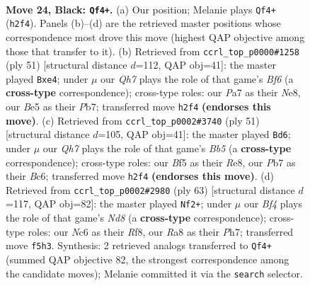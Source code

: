 \documentclass[11pt]{article}
\begin{document}
\clearpage

\begin{figure}[p]\centering
\begin{subfigure}{0.46\textwidth}\centering
\resizebox{\linewidth}{!}{%
\newchessgame
\chessboard[
  setfen={r3k3/pp6/2n3p1/4bbP1/8/3BQ3/3B3q/1R3KN1 b q - 2 24},
  showmover=false,
  pgfstyle=straightmove, color=movearrow, markmove={h2-f4}
]}
\caption{}
\end{subfigure}\hfill
\begin{subfigure}{0.46\textwidth}\centering
\resizebox{\linewidth}{!}{%
\newchessgame
\chessboard[
  setfen={4n1k1/ppr3b1/3p3B/3Pp2p/4N3/3B1b1q/PP1Q4/1K4R1 b - - 9 26},
  showmover=false,
  pgfstyle=straightmove, color=movearrow, markmove={f3-e4}
]}
\caption{}
\end{subfigure}
\\[4pt]
\begin{subfigure}{0.46\textwidth}\centering
\resizebox{\linewidth}{!}{%
\newchessgame
\chessboard[
  setfen={4r1k1/3q4/p1b4p/3pB3/1b4P1/2NPQ2P/1P6/5RK1 b - - 0 26},
  showmover=false,
  pgfstyle=straightmove, color=movearrow, markmove={b4-d6}
]}
\caption{}
\end{subfigure}\hfill
\begin{subfigure}{0.46\textwidth}\centering
\resizebox{\linewidth}{!}{%
\newchessgame
\chessboard[
  setfen={Q1b2r1k/7p/5qp1/6p1/2Qb4/6P1/4B2P/3n1R1K b - - 6 32},
  showmover=false,
  pgfstyle=straightmove, color=movearrow, markmove={d1-f2}
]}
\caption{}
\end{subfigure}
\caption{\textbf{Move 24, Black: \texttt{Qf4+}.} (a) Our position; Melanie plays \texttt{Qf4+} (\texttt{h2f4}). Panels (b)--(d) are the retrieved master positions whose correspondence most drove this move (highest QAP objective among those that transfer to it). (b) Retrieved from \texttt{ccrl\_top\_p0000\#1258} (ply 51) [structural distance $d$=112, QAP obj=41]: the master played \texttt{Bxe4}; under $\mu$ our \emph{Qh7} plays the role of that game's \emph{Bf6} (a \textbf{cross-type} correspondence); cross-type roles: our \emph{P}a7 as their \emph{N}e8, our \emph{B}e5 as their \emph{P}b7; transferred move \texttt{h2f4} \textbf{(endorses this move)}. (c) Retrieved from \texttt{ccrl\_top\_p0002\#3740} (ply 51) [structural distance $d$=105, QAP obj=41]: the master played \texttt{Bd6}; under $\mu$ our \emph{Qh7} plays the role of that game's \emph{Bb5} (a \textbf{cross-type} correspondence); cross-type roles: our \emph{B}f5 as their \emph{R}e8, our \emph{P}b7 as their \emph{B}c6; transferred move \texttt{h2f4} \textbf{(endorses this move)}. (d) Retrieved from \texttt{ccrl\_top\_p0002\#2980} (ply 63) [structural distance $d$=117, QAP obj=82]: the master played \texttt{Nf2+}; under $\mu$ our \emph{Bf4} plays the role of that game's \emph{Nd8} (a \textbf{cross-type} correspondence); cross-type roles: our \emph{N}c6 as their \emph{R}f8, our \emph{R}a8 as their \emph{P}h7; transferred move \texttt{f5h3}. Synthesis: 2 retrieved analogs transferred to \texttt{Qf4+} (summed QAP objective 82, the strongest correspondence among the candidate moves); Melanie committed it via the \texttt{search} selector.}
\label{fig:thought-m47}
\end{figure}
\end{document}
